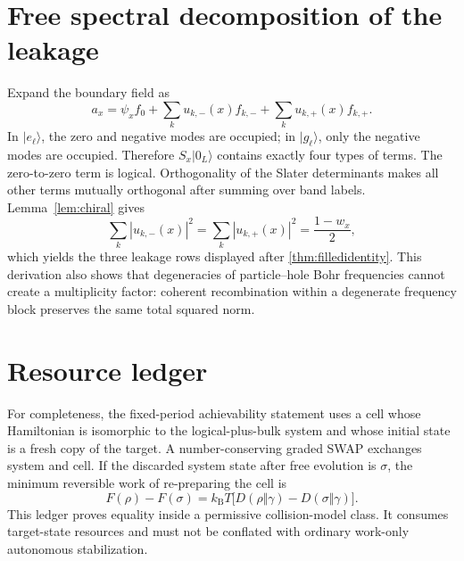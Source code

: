 \documentclass[11pt,a4paper]{article}
\theoremstyle{remark}
\begin{document}
\section{Free spectral decomposition of the leakage}

Expand the boundary field as
\[
 a_x=\psi_x f_0+\sum_k u_{k,-}(x)f_{k,-}+\sum_k u_{k,+}(x)f_{k,+}.
\]
In $|e_\ell\rangle$, the zero and negative modes are occupied; in $|g_\ell\rangle$, only the negative modes are occupied.  Therefore $S_x|0_L\rangle$ contains exactly four types of terms.  The zero-to-zero term is logical.  Orthogonality of the Slater determinants makes all other terms mutually orthogonal after summing over band labels.  Lemma~\ref{lem:chiral} gives
\[
 \sum_k|u_{k,-}(x)|^2
 =\sum_k|u_{k,+}(x)|^2
 =\frac{1-w_x}{2},
\]
which yields the three leakage rows displayed after \cref{thm:filledidentity}.  This derivation also shows that degeneracies of particle--hole Bohr frequencies cannot create a multiplicity factor: coherent recombination within a degenerate frequency block preserves the same total squared norm.

\section{Resource ledger}

For completeness, the fixed-period achievability statement uses a cell whose Hamiltonian is isomorphic to the logical-plus-bulk system and whose initial state is a fresh copy of the target.  A number-conserving graded SWAP exchanges system and cell.  If the discarded system state after free evolution is $\sigma$, the minimum reversible work of re-preparing the cell is
\[
 F(\rho)-F(\sigma)
 =k_{\mathrm B}T\bigl[D(\rho\Vert\gamma)-D(\sigma\Vert\gamma)\bigr].
\]
This ledger proves equality inside a permissive collision-model class.  It consumes target-state resources and must not be conflated with ordinary work-only autonomous stabilization.
\end{document}
